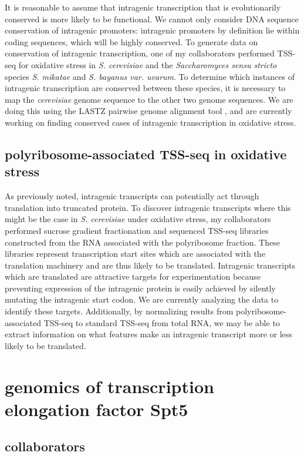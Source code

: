 \documentclass[9pt, letterpaper]{article}
\begin{document}
It is reasonable to assume that intragenic transcription that is evolutionarily conserved is more likely to be functional. We cannot only consider DNA sequence conservation of intragenic promoters: intragenic promoters by definition lie within coding sequences, which will be highly conserved. To generate data on conservation of intragenic transcription, one of my collaborators performed TSS-seq for oxidative stress in \textit{S. cerevisiae} and the \textit{Saccharomyces sensu stricto} species \textit{S. mikatae} and \textit{S. bayanus var. uvarum}. To determine which instances of intragenic transcription are conserved between these species, it is necessary to map the \textit{cerevisiae} genome sequence to the other two genome sequences. We are doing this using the LASTZ pairwise genome alignment tool \cite{harris2007}, and are currently working on finding conserved cases of intragenic transcription in oxidative stress.

\subsection{polyribosome-associated TSS-seq in oxidative stress}

As previously noted, intragenic transcripts can potentially act through translation into truncated protein. To discover intragenic transcripts where this might be the case in \textit{S. cerevisiae} under oxidative stress, my collaborators performed sucrose gradient fractionation and sequenced TSS-seq libraries constructed from the RNA associated with the polyribosome fraction. These libraries represent transcription start sites which are associated with the translation machinery and are thus likely to be translated. Intragenic transcripts which are translated are attractive targets for experimentation because preventing expression of the intragenic protein is easily achieved by silently mutating the intragenic start codon. We are currently analyzing the data to identify these targets. Additionally, by normalizing results from polyribosome-associated TSS-seq to standard TSS-seq from total RNA, we may be able to extract information on what features make an intragenic transcript more or less likely to be translated.

\newpage
\section{genomics of transcription elongation factor Spt5}

\subsection{collaborators}
\end{document}

